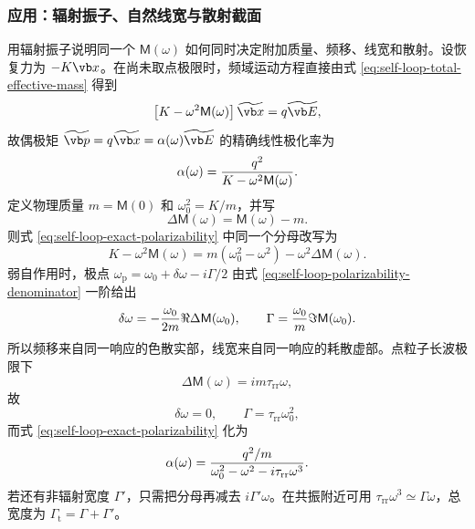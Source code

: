 \subsubsection{应用：辐射振子、自然线宽与散射截面}

用辐射振子说明同一个 $\mathsf M(\omega)$ 如何同时决定附加质量、频移、线宽和散射。设恢复力为 $-K\vb x$。在尚未取点极限时，频域运动方程直接由式 \eqref{eq:self-loop-total-effective-mass} 得到
\begin{equation}
 \left[K-\omega^2\mathsf M(\omega)\right]\widetilde{\vb x}
 =q\widetilde{\vb E},
\end{equation}
故偶极矩 $\widetilde{\vb p}=q\widetilde{\vb x}=\alpha(\omega)\widetilde{\vb E}$ 的精确线性极化率为
\begin{equation}
 \alpha(\omega)
 ={q^2\over K-\omega^2\mathsf M(\omega)}.
 \label{eq:self-loop-exact-polarizability}
\end{equation}
定义物理质量 $m=\mathsf M(0)$ 和 $\omega_0^2=K/m$，并写
\begin{equation*}
 \Delta\mathsf M(\omega)=\mathsf M(\omega)-m.
\end{equation*}
则式 \eqref{eq:self-loop-exact-polarizability} 中同一个分母改写为
\begin{equation}
 K-\omega^2\mathsf M(\omega)
 =m(\omega_0^2-\omega^2)-\omega^2\Delta\mathsf M(\omega).
 \label{eq:self-loop-polarizability-denominator}
\end{equation}
弱自作用时，极点 $\omega_{\mathrm p}=\omega_0+\delta\omega-i\Gamma/2$ 由式 \eqref{eq:self-loop-polarizability-denominator} 一阶给出
\begin{equation}
 \delta\omega
 =-{\omega_0\over2m}\Re\Delta\mathsf M(\omega_0),
 \qquad
 \Gamma
 ={\omega_0\over m}\Im\mathsf M(\omega_0).
 \label{eq:self-loop-shift-width}
\end{equation}
所以频移来自同一响应的色散实部，线宽来自同一响应的耗散虚部。点粒子长波极限下
\begin{equation*}
 \Delta\mathsf M(\omega)=im\tau_{\mathrm{rr}}\omega,
\end{equation*}
故
\begin{equation*}
 \delta\omega=0,
 \qquad
 \Gamma=\tau_{\mathrm{rr}}\omega_0^2,
\end{equation*}
而式 \eqref{eq:self-loop-exact-polarizability} 化为
\begin{equation}
 \alpha(\omega)
 ={q^2/m\over\omega_0^2-\omega^2-i\tau_{\mathrm{rr}}\omega^3}.
 \label{eq:self-loop-point-polarizability}
\end{equation}
若还有非辐射宽度 $\Gamma'$，只需把分母再减去 $i\Gamma'\omega$。在共振附近可用 $\tau_{\mathrm{rr}}\omega^3\simeq\Gamma\omega$，总宽度为 $\Gamma_{\mathrm t}=\Gamma+\Gamma'$。

